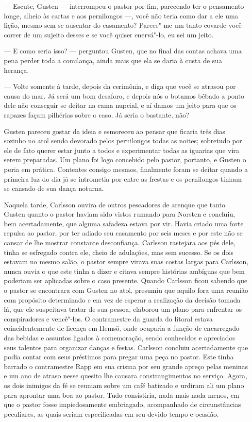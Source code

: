 --- Escute, Gusten --- interrompeu o pastor por fim, parecendo ter o
pensamento longe,  alheio às cartas e aos pernilongos ---, você não teria como
dar a ele uma lição, mesmo sem se ausentar do casamento? Parece"-me um tanto covarde
você correr de um sujeito desses e se você quiser enervá"-lo, eu sei um jeito.


--- E como seria isso? --- perguntou Gusten, que no final das contas achava uma
pena perder toda a comilança, ainda mais que ela se daria à custa de sua
herança.

--- Volte somente à tarde, depois da cerimônia, e diga que você se atrasou por
causa do mar. Já será um bom desaforo, e depois nós o botamos bêbado a ponto
dele não conseguir se deitar na cama nupcial, e aí damos um jeito para que os
rapazes façam pilhérias sobre o caso. Já seria o bastante, não?

Gusten pareceu gostar da ideia e esmoreceu ao pensar que ficaria três dias
sozinho no atol sendo devorado pelos pernilongos todas as noites; sobretudo por
ele de fato querer estar junto a todos e experimentar todas as iguarias que
vira serem preparadas. Um plano foi logo concebido pelo pastor, portanto, e
Gusten o poria em prática. Contentes consigo mesmos, finalmente foram se
deitar quando a primeira luz do dia já se intrometia por entre as frestas e os
pernilongos tinham se cansado de sua dança noturna.

\asterisc

 Naquela tarde, Carlsson ouvira de outros pescadores de arenque que tanto Gusten
 quanto o pastor haviam sido vistos rumando para Norsten e concluiu, bem
 acertadamente, que alguma safadeza estava por vir. Havia criado uma forte
 repulsa ao pastor, por ter adiado seu casamento por seis meses e
 por este não se cansar de lhe mostrar constante desconfiança. Carlsson
 rastejara aos pés dele, tinha se esfregado contra ele, cheio de adulações, mas sem sucesso. Se
 os dois estavam no mesmo salão, o pastor sempre virava suas costas largas para
 Carlsson, nunca ouvia o que este tinha a dizer e citava sempre histórias ambíguas que
 bem poderiam ser aplicadas sobre o caso presente. Quando Carlsson ficou
 sabendo que o pastor se encontrara com Gusten no atol, presumiu que aquilo
 fora uma reunião com propósito determinado e em vez de esperar a realização da
 decisão tomada lá, que ele suspeitava tratar de sua pessoa, elaborou um
 plano para enfrentar os conspiradores e vencê"-los. O contramestre da guarda do
 litoral estava coincidentemente de licença em Hemsö, onde ocuparia a função de
 encarregado das bebidas e assuntos ligados à comemoração, sendo conhecidos e
 apreciados seus talentos para organizar danças e festas. Carlsson concluiu
 acertadamente que podia contar com seus préstimos para pregar uma peça no
 pastor. Este tinha barrado o contramestre Rapp em sua crisma por seu grande
 apreço pelas meninas e um ano de atraso nesse quesito lhe causara
 constrangimentos no serviço. Agora, os dois inimigos da fé se reuniam sobre um
 café batizado e urdiram ali um plano para aprontar uma boa ao pastor. Tudo
 consistiria, nada mais nada menos, em que o pastor fosse impiedosamente
 embriagado, acompanhado de circunstâncias peculiares, as quais seriam
 especificadas em seu devido tempo e ocasião.

